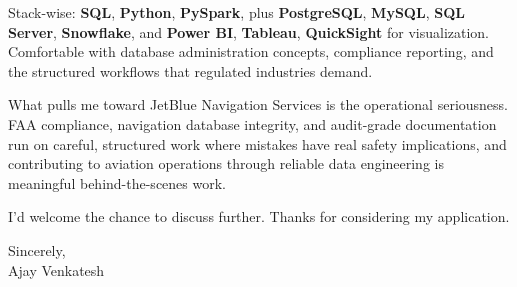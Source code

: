 \documentclass[letterpaper,11pt]{article}
\begin{document}
Stack-wise: \textbf{SQL}, \textbf{Python}, \textbf{PySpark}, plus \textbf{PostgreSQL}, \textbf{MySQL}, \textbf{SQL Server}, \textbf{Snowflake}, and \textbf{Power BI}, \textbf{Tableau}, \textbf{QuickSight} for visualization. Comfortable with database administration concepts, compliance reporting, and the structured workflows that regulated industries demand.

What pulls me toward JetBlue Navigation Services is the operational seriousness. FAA compliance, navigation database integrity, and audit-grade documentation run on careful, structured work where mistakes have real safety implications, and contributing to aviation operations through reliable data engineering is meaningful behind-the-scenes work.

I'd welcome the chance to discuss further. Thanks for considering my application.

\vspace{12pt}
Sincerely, \\
Ajay Venkatesh
\end{document}
